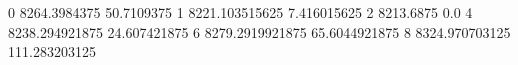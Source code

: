 0 8264.3984375 50.7109375
1 8221.103515625 7.416015625
2 8213.6875 0.0
4 8238.294921875 24.607421875
6 8279.2919921875 65.6044921875
8 8324.970703125 111.283203125
